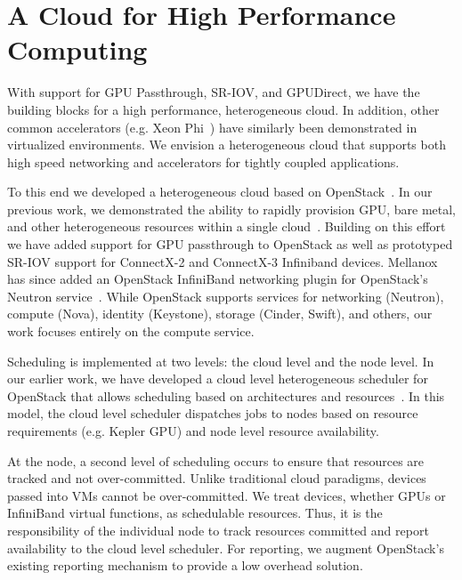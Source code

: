 \section{A Cloud for High Performance Computing}\label{openstack}
With support for GPU Passthrough, SR-IOV, and GPUDirect, we have the building
blocks for a high performance, heterogeneous cloud.  In addition, other common
accelerators (e.g. Xeon Phi~\cite{Phi}) have similarly been demonstrated in
virtualized environments.  We envision a heterogeneous cloud that supports
both high speed networking and accelerators for tightly coupled applications.

To this end we developed a heterogeneous cloud based on
OpenStack~\cite{www-openstack}.  In our previous work, we demonstrated the ability to rapidly provision GPU, bare metal, and other
heterogeneous resources within a single cloud~\cite{crago2011heterogeneous}.
Building on this effort we have added support for GPU passthrough to OpenStack
as well as prototyped SR-IOV support for ConnectX-2 and ConnectX-3 Infiniband devices.
Mellanox  has since added an OpenStack InfiniBand networking plugin for
OpenStack's Neutron service~\cite{ML2}. %
While OpenStack supports services for networking (Neutron), compute (Nova), identity
(Keystone), storage (Cinder, Swift), and others, our work focuses entirely
on the compute service.  

Scheduling is implemented at two levels: the cloud level and the node level.  In
our earlier work, we have developed a cloud level heterogeneous scheduler for OpenStack that 
allows scheduling based on architectures and
resources~\cite{crago2011heterogeneous}.  In this model, the cloud level
scheduler dispatches jobs to nodes based on resource requirements (e.g. Kepler
GPU) and node level resource availability.

At the node, a second level of scheduling occurs to ensure that resources are
tracked and not over-committed.  Unlike traditional cloud paradigms, devices
passed into VMs cannot be over-committed.  We treat devices, whether GPUs or
InfiniBand virtual functions, as schedulable resources.  Thus, it is the responsibility of the
individual node to track resources committed and report availability to the
cloud level scheduler.  For reporting, we augment OpenStack's
existing reporting mechanism to provide a low overhead solution.


